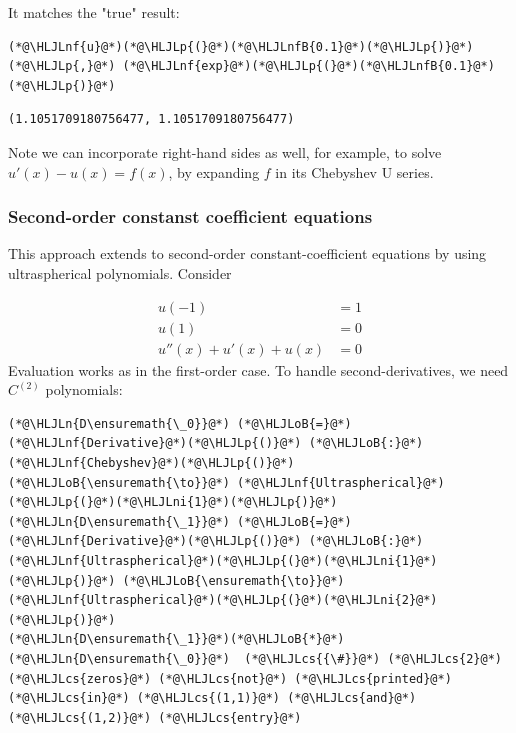 \documentclass[12pt,a4paper]{article}
\newcommand{\HLJLn}[1]{#1}
\newcommand{\HLJLnf}[1]{\textcolor[RGB]{66,102,213}{#1}}
\newcommand{\HLJLnfB}[1]{\textcolor[RGB]{59,151,46}{#1}}
\newcommand{\HLJLni}[1]{\textcolor[RGB]{59,151,46}{#1}}
\newcommand{\HLJLoB}[1]{\textcolor[RGB]{102,102,102}{\textbf{#1}}}
\newcommand{\HLJLp}[1]{#1}
\newcommand{\HLJLcs}[1]{\textcolor[RGB]{153,153,119}{\textit{#1}}}
\begin{document}
It matches the "true" result:


\begin{lstlisting}
(*@\HLJLnf{u}@*)(*@\HLJLp{(}@*)(*@\HLJLnfB{0.1}@*)(*@\HLJLp{)}@*) (*@\HLJLp{,}@*) (*@\HLJLnf{exp}@*)(*@\HLJLp{(}@*)(*@\HLJLnfB{0.1}@*)(*@\HLJLp{)}@*)
\end{lstlisting}

\begin{lstlisting}
(1.1051709180756477, 1.1051709180756477)
\end{lstlisting}


Note we can incorporate right-hand sides as well, for example, to solve $u'(x) - u(x) = f(x)$, by expanding $f$ in its Chebyshev U series.

\subsubsection{Second-order constanst coefficient equations}
This approach extends to second-order constant-coefficient equations by using ultraspherical polynomials.  Consider


\begin{align*}
u(-1) &= 1\\
u(1) &= 0\\
u''(x) + u'(x)  + u(x) &= 0
\end{align*}
Evaluation works as in the first-order case. To handle second-derivatives, we need $C^{(2)}$ polynomials:


\begin{lstlisting}
(*@\HLJLn{D\ensuremath{\_0}}@*) (*@\HLJLoB{=}@*) (*@\HLJLnf{Derivative}@*)(*@\HLJLp{()}@*) (*@\HLJLoB{:}@*) (*@\HLJLnf{Chebyshev}@*)(*@\HLJLp{()}@*) (*@\HLJLoB{\ensuremath{\to}}@*) (*@\HLJLnf{Ultraspherical}@*)(*@\HLJLp{(}@*)(*@\HLJLni{1}@*)(*@\HLJLp{)}@*)
(*@\HLJLn{D\ensuremath{\_1}}@*) (*@\HLJLoB{=}@*) (*@\HLJLnf{Derivative}@*)(*@\HLJLp{()}@*) (*@\HLJLoB{:}@*) (*@\HLJLnf{Ultraspherical}@*)(*@\HLJLp{(}@*)(*@\HLJLni{1}@*)(*@\HLJLp{)}@*) (*@\HLJLoB{\ensuremath{\to}}@*) (*@\HLJLnf{Ultraspherical}@*)(*@\HLJLp{(}@*)(*@\HLJLni{2}@*)(*@\HLJLp{)}@*)
(*@\HLJLn{D\ensuremath{\_1}}@*)(*@\HLJLoB{*}@*)(*@\HLJLn{D\ensuremath{\_0}}@*)  (*@\HLJLcs{{\#}}@*) (*@\HLJLcs{2}@*) (*@\HLJLcs{zeros}@*) (*@\HLJLcs{not}@*) (*@\HLJLcs{printed}@*) (*@\HLJLcs{in}@*) (*@\HLJLcs{(1,1)}@*) (*@\HLJLcs{and}@*) (*@\HLJLcs{(1,2)}@*) (*@\HLJLcs{entry}@*)
\end{lstlisting}
\end{document}
